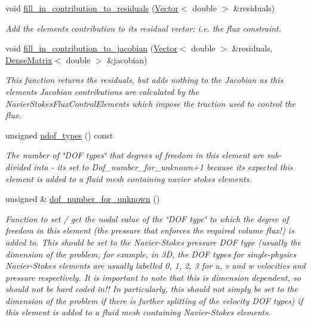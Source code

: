 \begin{DoxyCompactItemize}
void \hyperlink{classoomph_1_1NetFluxControlElement_a1042b589f6b086f5485214057f255678}{fill\+\_\+in\+\_\+contribution\+\_\+to\+\_\+residuals} (\hyperlink{classoomph_1_1Vector}{Vector}$<$ double $>$ \&residuals)
\begin{DoxyCompactList}\small\item\em Add the element\textquotesingle{}s contribution to its residual vector\+: i.\+e. the flux constraint. \end{DoxyCompactList}\item 
void \hyperlink{classoomph_1_1NetFluxControlElement_a7b7d3a32fcad5b06fe6a49f05f2c01a9}{fill\+\_\+in\+\_\+contribution\+\_\+to\+\_\+jacobian} (\hyperlink{classoomph_1_1Vector}{Vector}$<$ double $>$ \&residuals, \hyperlink{classoomph_1_1DenseMatrix}{Dense\+Matrix}$<$ double $>$ \&jacobian)
\begin{DoxyCompactList}\small\item\em This function returns the residuals, but adds nothing to the Jacobian as this element\textquotesingle{}s Jacobian contributions are calculated by the Navier\+Stokes\+Flux\+Control\+Elements which impose the traction used to control the flux. \end{DoxyCompactList}\item 
unsigned \hyperlink{classoomph_1_1NetFluxControlElement_a16809a8ad123ba41f826d9e920aba9e0}{ndof\+\_\+types} () const
\begin{DoxyCompactList}\small\item\em The number of \char`\"{}\+D\+O\+F types\char`\"{} that degrees of freedom in this element are sub-\/divided into -\/ it\textquotesingle{}s set to Dof\+\_\+number\+\_\+for\+\_\+unknown+1 because it\textquotesingle{}s expected this element is added to a fluid mesh containing navier stokes elements. \end{DoxyCompactList}\item 
unsigned \& \hyperlink{classoomph_1_1NetFluxControlElement_a43142408a4d2cea51b26d0c641bb0f51}{dof\+\_\+number\+\_\+for\+\_\+unknown} ()
\begin{DoxyCompactList}\small\item\em Function to set / get the nodal value of the \char`\"{}\+D\+O\+F type\char`\"{} to which the degree of freedom in this element (the pressure that enforces the required volume flux!) is added to. This should be set to the Navier-\/\+Stokes pressure D\+OF type (usually the dimension of the problem, for example, in 3D, the D\+OF types for single-\/physics Navier-\/\+Stokes elements are usually labelled 0, 1, 2, 3 for u, v and w velocities and pressure respectively. It is important to note that this is dimension dependent, so should not be hard coded in!! In particularly, this should not simply be set to the dimension of the problem if there is further splitting of the velocity D\+OF types) if this element is added to a fluid mesh containing Navier-\/\+Stokes elements. \end{DoxyCompactList}\item 

\end{DoxyCompactItemize}
